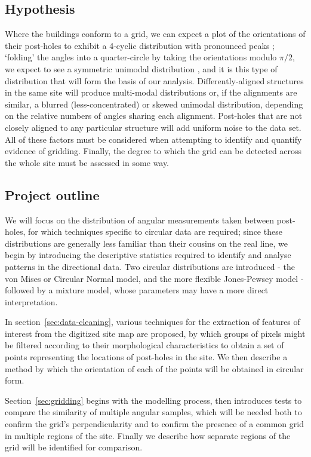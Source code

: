 \documentclass[../../ArchStats.tex]{subfiles}
\begin{document}
\subsection{Hypothesis}
Where the buildings conform to a grid, %
we can expect a plot of the orientations of their post-holes to exhibit a 4-cyclic distribution with pronounced peaks%
; `folding' the angles into a quarter-circle by taking the orientations modulo $\pi/2$, we expect to see a symmetric unimodal distribution%
, and it is this type of distribution that will form the basis of our analysis. Differently-aligned structures in the same site will produce multi-modal distributions or, if the alignments are similar, a blurred (less-concentrated) or skewed unimodal distribution, depending on the relative numbers of angles sharing each alignment. Post-holes that are not closely aligned to any particular structure will add uniform noise to the data set. All of these factors must be considered when attempting to identify and quantify evidence of gridding. Finally, the degree to which the grid can be detected across the whole site must be assessed in some way.


\subsection{Project outline}
We will focus on the distribution of angular measurements taken between post-holes, for which techniques specific to circular data are required; since these distributions are generally less familiar than their cousins on the real line, we begin by introducing the descriptive statistics required to identify and analyse patterns in the directional data. Two circular distributions are introduced - the von Mises or Circular Normal model, and the more flexible Jones-Pewsey model - followed by a mixture model, whose parameters may have a more direct interpretation.

In section~\ref{sec:data-cleaning}, various techniques for the extraction of features of interest from the digitized site map are proposed, by which groups of pixels might be filtered according to their morphological characteristics to obtain a set of points representing the locations of post-holes in the site. We then describe a method by which the orientation of each of the points will be obtained in circular form.

Section~\ref{sec:gridding} begins with the modelling process, then introduces tests to compare the similarity of multiple angular samples, which will be needed both to confirm the grid's perpendicularity and to confirm the presence of a common grid in multiple regions of the site. Finally we describe how separate regions of the grid will be identified for comparison.
\end{document}
